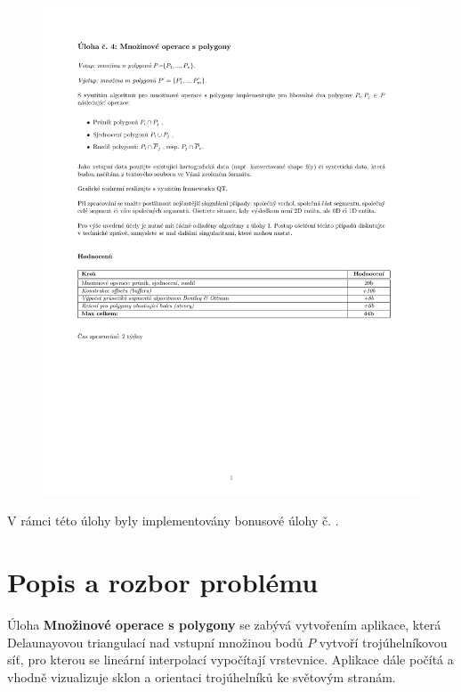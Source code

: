 \documentclass[a4paper, 12pt]{article}
\begin{document}
\begin{figure}[h!]
	\includegraphics[clip, trim=0cm 8.5cm 0cm 3cm, width=1.0\textwidth]{./pictures/zadani04.pdf}
\end{figure}

V rámci této úlohy byly implementovány bonusové úlohy č. .
\clearpage

\section{Popis a rozbor problému}
Úloha \textbf{Množinové operace s polygony} se zabývá vytvořením aplikace, která Delaunayovou triangulací nad vstupní množinou bodů $P$ vytvoří trojúhelníkovou síť, pro kterou se lineární interpolací vypočítají vrstevnice. Aplikace dále počítá a vhodně vizualizuje sklon a orientaci trojúhelníků ke světovým stranám.\\ 
\end{document}
